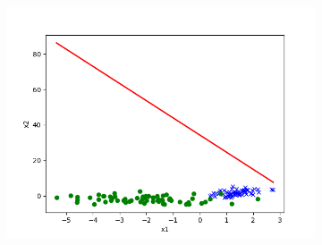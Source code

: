 \begin{answer}
\begin{figure}[htbp]
\begin{subfigure}[b]{0.5\linewidth}
            \centering
            \includegraphics[width=\linewidth]{../src/output/p02e_pred.png}
        \end{subfigure}
    \end{figure}
\end{answer}
